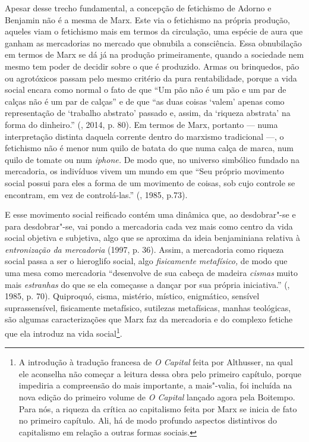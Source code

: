 Apesar desse trecho fundamental, a concepção de fetichismo de Adorno e
Benjamin não é a mesma de Marx. Este via o fetichismo na própria
produção, aqueles viam o fetichismo mais em termos da circulação, uma
espécie de aura que ganham as mercadorias no mercado que obnubila a
consciência. Essa obnubilação em termos de Marx se dá já na produção
primeiramente, quando a sociedade nem mesmo tem poder de decidir sobre o
que é produzido. Armas ou brinquedos, pão ou agrotóxicos passam pelo
mesmo critério da pura rentabilidade, porque a vida social encara como
normal o fato de que ``Um pão não é um pão e um par de calças não é um
par de calças'' e de que ``as duas coisas `valem' apenas como
representação de `trabalho abstrato' passado e, assim, da `riqueza
abstrata' na forma do dinheiro.'' (, 2014, p. 80). Em termos de
Marx, portanto --- numa interpretação distinta daquela corrente dentro do marxismo
tradicional ---, o fetichismo não é menor num quilo de batata do que numa
calça de marca, num quilo de tomate ou num \emph{iphone.} De modo que,
no universo simbólico fundado na mercadoria, os indivíduos vivem um
mundo em que ``Seu próprio movimento social possui para eles a forma de
um movimento de coisas, sob cujo controle se encontram, em vez de
controlá-las.'' (, 1985, p.73).

E esse movimento social reificado contém uma dinâmica que, ao
desdobrar"-se e para desdobrar"-se, vai pondo a mercadoria cada vez mais
como centro da vida social objetiva e subjetiva, algo que se aproxima da
ideia benjaminiana relativa à \emph{entronização da mercadoria} (1997, p. 36).
Assim, a mercadoria como riqueza social passa a ser o hieroglifo social,
algo \emph{fisicamente} \emph{metafísico,} de modo que uma mesa como
mercadoria ``desenvolve de sua cabeça de madeira \emph{cismas} muito
mais \emph{estranhas} do que se ela começasse a dançar por sua própria
iniciativa.'' (, 1985, p. 70). Quiproquó, cisma, mistério, místico,
enigmático, sensível suprassensível, fisicamente metafísico, sutilezas
metafísicas, manhas teológicas, são algumas caracterizações que Marx faz
da mercadoria e do complexo fetiche que ela introduz na vida
social\footnote{A introdução à tradução francesa de \emph{O Capital}
  feita por Althusser, na qual ele aconselha não começar a leitura dessa
  obra pelo primeiro capítulo, porque impediria a compreensão do mais
  importante, a mais"-valia, foi incluída na nova edição do primeiro
  volume de \emph{O Capital} lançado agora pela Boitempo. Para nós, a
  riqueza da crítica ao capitalismo feita por Marx se inicia de fato no
  primeiro capítulo. Ali, há de modo profundo aspectos distintivos do
  capitalismo em relação a outras formas sociais.}.

